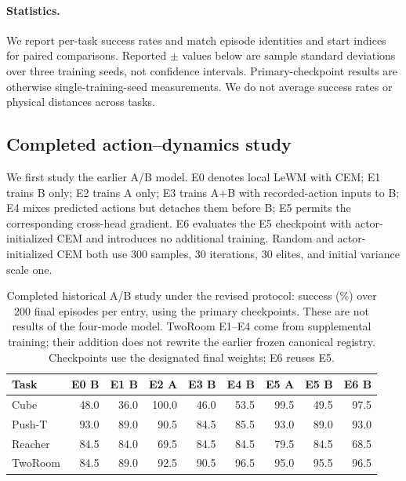 \paragraph{Statistics.}
We report per-task success rates and match episode identities and start indices for paired comparisons. Reported $\pm$ values below are sample standard deviations over three training seeds, not confidence intervals. Primary-checkpoint results are otherwise single-training-seed measurements. We do not average success rates or physical distances across tasks.

\subsection{Completed action--dynamics study}

We first study the earlier A/B model. E0 denotes local LeWM with CEM; E1 trains B only; E2 trains A only; E3 trains A+B with recorded-action inputs to B; E4 mixes predicted actions but detaches them before B; E5 permits the corresponding cross-head gradient. E6 evaluates the E5 checkpoint with actor-initialized CEM and introduces no additional training.
Random and actor-initialized CEM both use 300 samples, 30 iterations, 30 elites, and initial variance scale one.

\begin{table}[t]
 \centering
 \small
 \begin{tabular}{lrrrrrrrr}
  \toprule
  Task & E0 B & E1 B & E2 A & E3 B & E4 B & E5 A & E5 B & E6 B \\
  \midrule
  Cube    & 48.0 & 36.0 & 100.0 & 46.0 & 53.5 & 99.5 & 49.5 & 97.5 \\
  Push-T  & 93.0 & 89.0 & 90.5  & 84.5 & 85.5 & 93.0 & 89.0 & 93.0 \\
  Reacher & 84.5 & 84.0 & 69.5  & 84.5 & 84.5 & 79.5 & 84.5 & 68.5 \\
  TwoRoom & 84.5 & 89.0 & 92.5  & 90.5 & 96.5 & 95.0 & 95.5 & 96.5 \\
  \bottomrule
 \end{tabular}
 \caption{Completed historical A/B study under the revised protocol: success (\%) over 200 final episodes per entry, using the primary checkpoints. These are not results of the four-mode model. TwoRoom E1--E4 come from supplemental training; their addition does not rewrite the earlier frozen canonical registry. Checkpoints use the designated final weights; E6 reuses E5.}
 \label{tab:historical}
\end{table}

